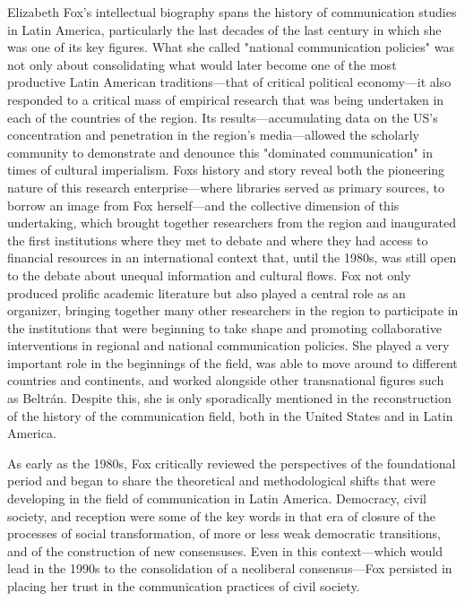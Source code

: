 \documentclass{tufte-handout}
\begin{document}
Elizabeth Fox's intellectual biography spans the history of
communication studies in Latin America, particularly the last decades of
the last century in which she was one of its key figures. What she
called "national communication policies" was not only about
consolidating what would later become one of the most productive Latin
American traditions---that of critical political economy---it also
responded to a critical mass of empirical research that was being
undertaken in each of the countries of the region. Its
results---accumulating data on the US's concentration and penetration in
the region's media---allowed the scholarly community to demonstrate and
denounce this "dominated communication" in times of cultural
imperialism. Fox\textquotesingle s history and story reveal both the
pioneering nature of this research enterprise---where libraries served
as primary sources, to borrow an image from Fox herself---and the
collective dimension of this undertaking, which brought together
researchers from the region and inaugurated the first institutions where
they met to debate and where they had access to financial resources in
an international context that, until the 1980s, was still open to the
debate about unequal information and cultural flows. Fox not only
produced prolific academic literature but also played a central role as
an organizer, bringing together many other researchers in the region to
participate in the institutions that were beginning to take shape and
promoting collaborative interventions in regional and national
communication policies. She played a very important role in the
beginnings of the field, was able to move around to different countries
and continents, and worked alongside other transnational figures such as
Beltrán. Despite this, she is only sporadically mentioned in the
reconstruction of the history of the communication field, both in the
United States and in Latin America.

As early as the 1980s, Fox critically reviewed the perspectives of the
foundational period and began to share the theoretical and
methodological shifts that were developing in the field of communication
in Latin America. Democracy, civil society, and reception were some of
the key words in that era of closure of the processes of social
transformation, of more or less weak democratic transitions, and of the
construction of new consensuses. Even in this context---which would lead
in the 1990s to the consolidation of a neoliberal consensus---Fox
persisted in placing her trust in the communication practices of civil
society.
\end{document}
